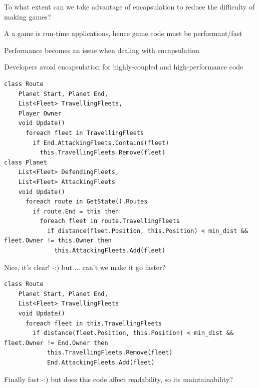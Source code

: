 \documentclass{beamer}
\begin{document}
\begin{slide}{
\item To what extent can we take advantage of encapsulation to reduce the difficulty of making games?
}\end{slide}

\begin{slide}{
\item A a game is run-time applications, hence game code must be performant/fast
\item Performance becomes an issue when dealing with encapsulation
\item Developers avoid encapsulation for highly-coupled and high-performance code
\item[]
\item[]
}\end{slide}

\begin{frame}[fragile]{\CurrentSection}
\begin{block}{\CurrentSubSection}
\begin{lstlisting}[frame=box,language=CAML,basicstyle=\tiny,backgroundcolor=\color{white}]
class Route
    Planet Start, Planet End,
    List<Fleet> TravellingFleets,
    Player Owner
    void Update()
      foreach fleet in TravellingFleets
        if End.AttackingFleets.Contains(fleet)
          this.TravellingFleets.Remove(fleet)
class Planet
    List<Fleet> DefendingFleets,
    List<Fleet> AttackingFleets
    void Update()
      foreach route in GetState().Routes
        if route.End = this then
          foreach fleet in route.TravellingFleets
            if distance(fleet.Position, this.Position) < min_dist && fleet.Owner != this.Owner then
              this.AttackingFleets.Add(fleet)
\end{lstlisting}
Nice, it's clear! -:) but ... can't we make it go faster? 
\end{block}
\end{frame}




\begin{frame}[fragile]{\CurrentSection}
\begin{block}{\CurrentSubSection}
\begin{lstlisting}[frame=box,language=CAML,basicstyle=\tiny,backgroundcolor=\color{white}]
class Route
    Planet Start, Planet End,
    List<Fleet> TravellingFleets
    void Update()
      foreach fleet in this.TravellingFleets
        if distance(fleet.Position, this.Position) < min_dist && fleet.Owner != End.Owner then
            this.TravellingFleets.Remove(fleet)
            End.AttackingFleets.Add(fleet)
\end{lstlisting}
Finally fast -:) but does this code affect readability, so its maintainability?
\end{block}
\end{frame}
\end{document}
